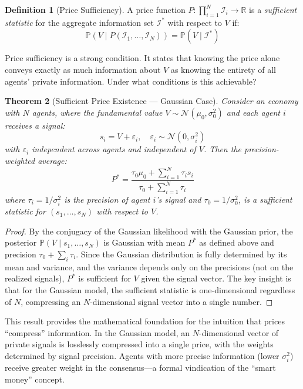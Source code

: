 \documentclass[12pt,a4paper]{article}
\newtheorem{theorem}{Theorem}[section]
\theoremstyle{definition}
\newtheorem{definition}[theorem]{Definition}
\newcommand{\Prob}{\mathbb{P}}
\newcommand{\R}{\mathbb{R}}
\newcommand{\I}{\mathcal{I}}
\begin{document}
\begin{definition}[Price Sufficiency]\label{def:price_suff}
A price function $P: \prod_{i=1}^N \I_i \to \R$ is a \emph{sufficient statistic} for the aggregate information set $\I^*$ with respect to $V$ if:
\begin{equation}
    \Prob(V \mid P(\I_1, \ldots, \I_N)) = \Prob(V \mid \I^*)
\end{equation}
\end{definition}

Price sufficiency is a strong condition. It states that knowing the price alone conveys exactly as much information about $V$ as knowing the entirety of all agents' private information. Under what conditions is this achievable?

\begin{theorem}[Sufficient Price Existence --- Gaussian Case]\label{thm:gaussian_sufficiency}
Consider an economy with $N$ agents, where the fundamental value $V \sim \mathcal{N}(\mu_0, \sigma_0^2)$ and each agent $i$ receives a signal:
\begin{equation}
    s_i = V + \varepsilon_i, \quad \varepsilon_i \sim \mathcal{N}(0, \sigma_i^2)
\end{equation}
with $\varepsilon_i$ independent across agents and independent of $V$. Then the precision-weighted average:
\begin{equation}\label{eq:precision_weighted}
    P^* = \frac{\tau_0 \mu_0 + \sum_{i=1}^{N} \tau_i s_i}{\tau_0 + \sum_{i=1}^{N} \tau_i}
\end{equation}
where $\tau_i = 1/\sigma_i^2$ is the precision of agent $i$'s signal and $\tau_0 = 1/\sigma_0^2$, is a sufficient statistic for $(s_1, \ldots, s_N)$ with respect to $V$.
\end{theorem}

\begin{proof}
By the conjugacy of the Gaussian likelihood with the Gaussian prior, the posterior $\Prob(V \mid s_1, \ldots, s_N)$ is Gaussian with mean $P^*$ as defined above and precision $\tau_0 + \sum_i \tau_i$. Since the Gaussian distribution is fully determined by its mean and variance, and the variance depends only on the precisions (not on the realized signals), $P^*$ is sufficient for $V$ given the signal vector. The key insight is that for the Gaussian model, the sufficient statistic is one-dimensional regardless of $N$, compressing an $N$-dimensional signal vector into a single number.
\end{proof}

This result provides the mathematical foundation for the intuition that prices ``compress'' information. In the Gaussian model, an $N$-dimensional vector of private signals is losslessly compressed into a single price, with the weights determined by signal precision. Agents with more precise information (lower $\sigma_i^2$) receive greater weight in the consensus---a formal vindication of the ``smart money'' concept.
\end{document}

